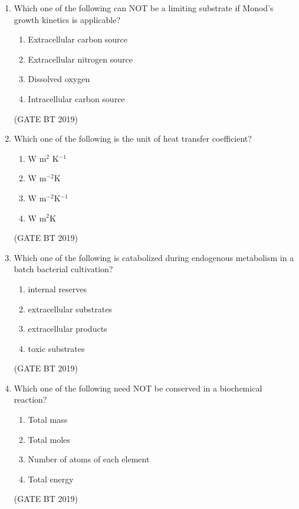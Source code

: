 \documentclass[journal,12pt,onecolumn]{IEEEtran}
\begin{document}
\begin{enumerate}
\item Which one of the following can NOT be a limiting substrate if Monod’s growth kinetics is applicable?

\begin{enumerate}
\item Extracellular carbon source
\item Extracellular nitrogen source
\item Dissolved oxygen
\item Intracellular carbon source
\end{enumerate}
\hfill(GATE BT 2019)

    \item Which one of the following is the unit of heat transfer coefficient?
    \begin{multicols}{4}
    \begin{enumerate}[label=(\Alph*)]
        \item W m$^2$ K$^{-1}$  
        \item W m$^{-2}$K  
        \item W m$^{-2}$K$^{-1}$  
        \item W m$^2$K  
    \end{enumerate}
    \end{multicols}\hfill(GATE BT 2019)

    \item Which one of the following is catabolized during endogenous metabolism in a batch bacterial cultivation?
    \begin{multicols}{2}
    \begin{enumerate}[label=(\Alph*)]
        \item internal reserves  
        \item extracellular substrates  
        \item extracellular products  
        \item toxic substrates  
    \end{enumerate}
    \end{multicols}\hfill(GATE BT 2019)

    \item Which one of the following need NOT be conserved in a biochemical reaction?
    \begin{multicols}{2}
    \begin{enumerate}[label=(\Alph*)]
        \item Total mass  
        \item Total moles  
        \item Number of atoms of each element  
        \item Total energy  
    \end{enumerate}
    \end{multicols}\hfill(GATE BT 2019)


\end{enumerate}
\end{document}
